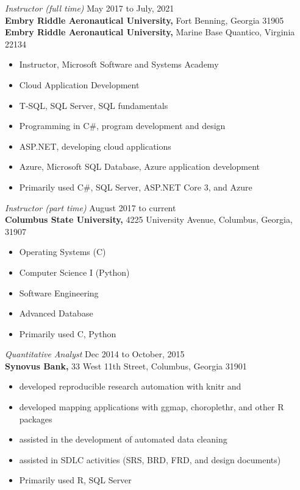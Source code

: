 \documentclass[margin, 10pt]{res} %
\begin{document}
\begin{resume}
{\it Instructor (full time)} \hfill May 2017 to July, 2021 \\
\textbf{Embry Riddle Aeronautical University,} \hfill Fort Benning, Georgia 31905 \\
\textbf{Embry Riddle Aeronautical University,} \hfill Marine Base Quantico, Virginia 22134
\begin{itemize} \itemsep -2pt %
\item Instructor, Microsoft Software and Systems Academy
\item Cloud Application Development
\item T-SQL, SQL Server, SQL fundamentals
\item Programming in C\#, program development and design
\item ASP.NET, developing cloud applications
\item Azure, Microsoft SQL Database, Azure application development
\item Primarily used C\#, SQL Server, ASP.NET Core 3, and Azure
\end{itemize}
 
{\it Instructor (part time)} \hfill August 2017 to current \\
\textbf{Columbus State University,} 4225 University Avenue, Columbus, Georgia, 31907

\begin{itemize} \itemsep -2pt %
\item Operating Systems (C)
\item Computer Science I (Python)
\item Software Engineering
\item Advanced Database
\item Primarily used C, Python
\end{itemize}

{\it Quantitative Analyst} \hfill Dec 2014 to October, 2015 \\
\textbf{Synovus Bank,} 33 West 11th Street, Columbus, Georgia 31901

\begin{itemize} \itemsep -2pt %
\item developed reproducible research automation with knitr and \LaTeXe
\item developed mapping applications with ggmap, choroplethr, and other \textsf{R} packages
\item assisted in the development of automated data cleaning 
\item assisted in SDLC activities (SRS, BRD, FRD, and design documents)
\item Primarily used \textsf{R}, SQL Server
\end{itemize}
 

\end{resume}
\end{document}
